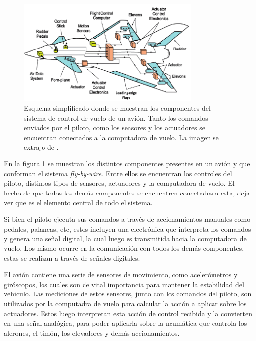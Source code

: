 \begin{figure}[H]
    \centering
    \includegraphics[width=0.8\textwidth]{img/avion_FBW.png}
    \caption{Esquema simplificado donde se muestran los componentes del sistema de control de vuelo de un avión. Tanto los comandos enviados por el piloto, como los sensores y los actuadores se encuentran conectados a la computadora de vuelo. La imagen se extrajo de \cite{collinson2023introduction}.}
    \label{fig:avion_FBW}
\end{figure}


En la figura \ref{fig:avion_FBW} se muestran los distintos componentes presentes en un avión y que conforman el sistema \textit{fly-by-wire}. Entre ellos se encuentran los controles del piloto, distintos tipos de sensores, actuadores y la computadora de vuelo. El hecho de que todos los demás componentes se encuentren conectados a esta, deja ver que es el elemento central de todo el sistema. 

Si bien el piloto ejecuta sus comandos a través de accionamientos manuales como pedales, palancas, etc, estos incluyen una electrónica que interpreta los comandos y genera una señal digital, la cual luego es transmitida hacia la computadora de vuelo. Los mismo ocurre en la comunicación con todos los demás componentes, estas se realizan a través de señales digitales.

El avión contiene una serie de sensores de movimiento, como acelerómetros y giróscopos, los cuales son de vital importancia para mantener la estabilidad del vehículo. Las mediciones de estos sensores, junto con los comandos del piloto, son utilizados por la computadra de vuelo para calcular la acción a aplicar sobre los actuadores. Estos luego interpretan esta acción de control recibida y la convierten en una señal analógica, para poder aplicarla sobre la neumática que controla los alerones, el timón, los elevadores y demás accionamientos. %

